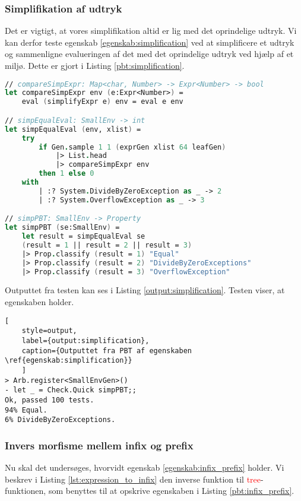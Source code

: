 \subsubsection{Simplifikation af udtryk}\label{sec:PBT_simplification}
Det er vigtigt, at vores simplifikation altid er lig med det oprindelige udtryk. Vi kan derfor teste egenskab \ref{egenskab:simplification} ved at simplificere et udtryk og sammenligne evalueringen af det med det oprindelige udtryk ved hjælp af et miljø. Dette er gjort i Listing \ref{pbt:simplification}.

\begin{lstlisting}[language={FSharp}, caption={PBT af egenskaben \ref{egenskab:simplification}}, label={pbt:simplification}]
// compareSimpExpr: Map<char, Number> -> Expr<Number> -> bool
let compareSimpExpr env (e:Expr<Number>) =
    eval (simplifyExpr e) env = eval e env

// simpEqualEval: SmallEnv -> int
let simpEqualEval (env, xlist) = 
    try
        if Gen.sample 1 1 (exprGen xlist 64 leafGen) 
            |> List.head 
            |> compareSimpExpr env 
        then 1 else 0
    with
        | :? System.DivideByZeroException as _ -> 2
        | :? System.OverflowException as _ -> 3

// simpPBT: SmallEnv -> Property
let simpPBT (se:SmallEnv) =
    let result = simpEqualEval se
    (result = 1 || result = 2 || result = 3)
    |> Prop.classify (result = 1) "Equal"
    |> Prop.classify (result = 2) "DivideByZeroExceptions"
    |> Prop.classify (result = 3) "OverflowException"   
\end{lstlisting}

Outputtet fra testen kan ses i Listing \ref{output:simplification}. Testen viser, at egenskaben holder.

\begin{lstlisting}[
    style=output, 
    label={output:simplification}, 
    caption={Outputtet fra PBT af egenskaben \ref{egenskab:simplification}}
    ]
> Arb.register<SmallEnvGen>()
- let _ = Check.Quick simpPBT;;
Ok, passed 100 tests.
94% Equal.
6% DivideByZeroExceptions.
\end{lstlisting}

\subsubsection{Invers morfisme mellem infix og prefix}\label{sec:PBT_infix_prefix}
Nu skal det undersøges, hvorvidt egenskab \ref{egenskab:infix_prefix} holder. Vi beskrev i Listing \ref{lst:expression_to_infix} den inverse funktion til \textcolor{red}{tree}-funktionen, som benyttes til at opskrive egenskaben i Listing \ref{pbt:infix_prefix}.

